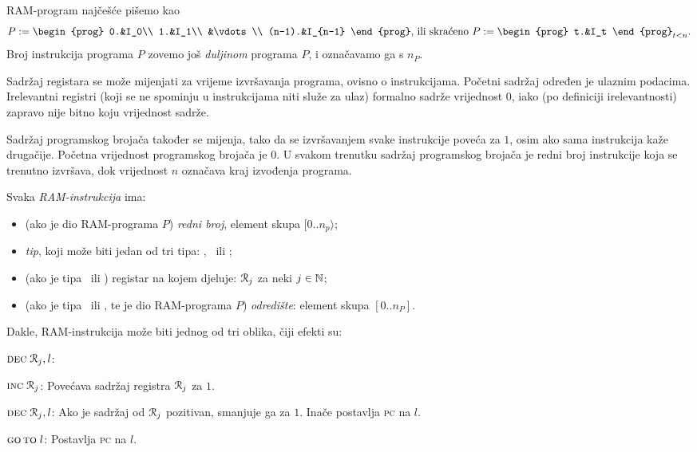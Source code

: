 RAM-program najčešće pišemo kao \begin{equation}
P:=\begin{prog}
    0.&I_0\\
    1.&I_1\\
    &\vdots\\
    (n-1).&I_{n-1}
    \end{prog}\text{, ili skraćeno } P:=\begin{prog}
    t.&I_t
    \end{prog}_{t<n}\text.
\end{equation}
Broj instrukcija programa $P$ zovemo još \emph{duljinom} programa $P$, i označavamo ga s $n_P$.

Sadržaj registara se može mijenjati za vrijeme izvršavanja programa, ovisno o instrukcijama. Početni sadržaj određen je ulaznim podacima. Irelevantni registri (koji se ne spominju u instrukcijama niti služe za ulaz) formalno sadrže vrijednost $0$, iako (po definiciji irelevantnosti) zapravo nije bitno koju vrijednost sadrže.

Sadržaj programskog brojača također se mijenja, tako da se iz\-vr\-ša\-va\-njem svake instrukcije poveća za $1$, osim ako sama instrukcija kaže drugačije. Početna vrijednost programskog brojača je $0$. U svakom trenutku sadržaj programskog brojača je redni broj instrukcije koja se trenutno izvršava, dok vrijednost $n$ označava kraj izvođenja programa.

\begin{definicija}[{name=[RAM-instrukcija]}]
Svaka \emph{RAM-instrukcija} ima:
\begin{itemize}
    \item (ako je dio RAM-programa $P$) \emph{redni broj}, element skupa $[0..n_p\rangle$;
    \item \emph{tip}, koji može biti jedan od tri tipa: \inc, \dec\ ili \goto;
    \item (ako je tipa \inc\ ili \dec) registar na kojem djeluje: $\mathcal R_{j}$ za neki $j\in{\mathbb N}$;
    \item (ako je tipa \dec\ ili \goto, te je dio RAM-programa $P$) \emph{odredište}: element skupa $[0..n_P]$.
    \qedhere
\end{itemize}
\end{definicija}

Dakle, RAM-instrukcija može biti jednog od tri oblika, čiji efekti su:

\begin{labeling}{$\textsc{dec}\;\mathcal R_{j},l$:}
    \item[$\textsc{inc}\;\mathcal R_{j}$:] Povećava sadržaj registra $\mathcal R_{j}$ za $1$.
    \item[$\textsc{dec}\;\mathcal R_{j},l$:] Ako je sadržaj od $\mathcal R_{j}$ pozitivan, smanjuje ga za $1$. Inače postavlja \textsc{pc} na $l$.
    \item[$\textsc{go\,to}\;l$:] Postavlja \textsc{pc} na $l$.
\end{labeling}

